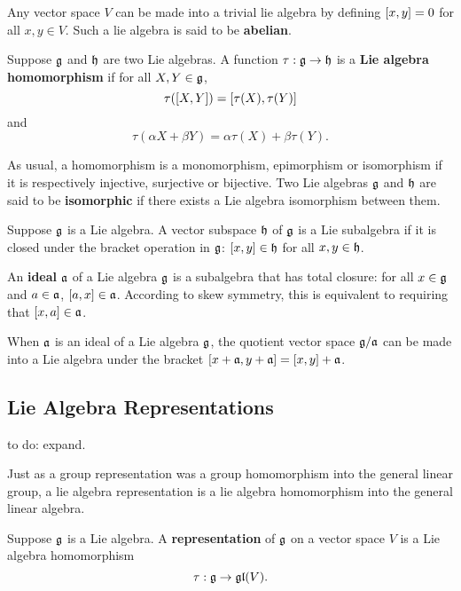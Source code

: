 \documentclass[a4paper]{article}
\begin{document}
Any vector space $V$ can be made into a trivial lie algebra by defining $\left[ x, y \right] = 0$ for all $x, y \in V$. Such a lie algebra is said to be \textbf{abelian}.

\begin{defi}
    Suppose $\mathfrak{g}$ and $\mathfrak{h}$ are two Lie algebras. A function $\tau: \mathfrak{g} \to \mathfrak{h}$ is a \textbf{Lie algebra homomorphism} if for all $X, Y \in \mathfrak{g}$, $$\tau(\left[ X, Y \right]) = \left[ \tau(X), \tau(Y) \right]$$ and $$\tau(\alpha X + \beta Y) = \alpha \tau(X) + \beta \tau(Y).$$
\end{defi}

As usual, a homomorphism is a monomorphism, epimorphism or isomorphism if it is respectively injective, surjective or bijective. Two Lie algebras $\mathfrak{g}$ and $\mathfrak{h}$ are said to be \textbf{isomorphic} if there exists a Lie algebra isomorphism between them. 

\begin{defi}[Subalgebra]
    Suppose $\mathfrak{g}$ is a Lie algebra. A vector subspace $\mathfrak{h}$ of $\mathfrak{g}$ is a Lie subalgebra if it is closed under the bracket operation in $\mathfrak{g}$: $\left[ x, y \right] \in \mathfrak{h}$ for all $x, y \in \mathfrak{h}$.
\end{defi}

\begin{defi}[ideal]
    An \textbf{ideal} $\mathfrak{a}$ of a Lie algebra $\mathfrak{g}$ is a subalgebra that has total closure: for all $x \in \mathfrak{g}$ and $a \in \mathfrak{a}$, $\left[ a, x \right] \in \mathfrak{a}$. According to skew symmetry, this is equivalent to requiring that $\left[ x, a \right] \in \mathfrak{a}$.
\end{defi}

When $\mathfrak{a}$ is an ideal of a Lie algebra $\mathfrak{g}$, the quotient vector space $\mathfrak{g}/\mathfrak{a}$ can be made into a Lie algebra under the bracket $\left[ x + \mathfrak{a}, y + \mathfrak{a} \right] = \left[ x, y \right] + \mathfrak{a}$.

\subsection{Lie Algebra Representations}
to do: expand.

Just as a group representation was a group homomorphism into the general linear group, a lie algebra representation is a lie algebra homomorphism into the general linear algebra.

\begin{defi}
    Suppose $\mathfrak{g}$ is a Lie algebra. A \textbf{representation} of $\mathfrak{g}$ on a vector space $V$ is a Lie algebra homomorphism 
    $$\tau : \mathfrak{g} \to \mathfrak{gl}(V).$$
\end{defi}
\end{document}
